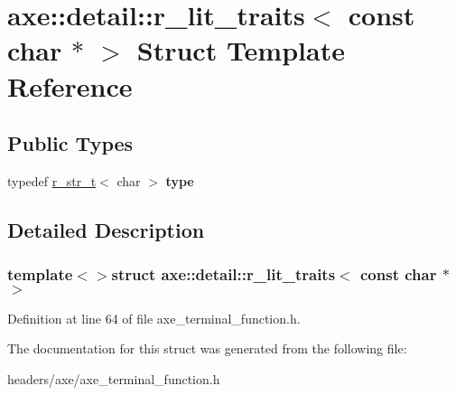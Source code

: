 \hypertarget{structaxe_1_1detail_1_1r__lit__traits_3_01const_01char_01_5_01_4}{\section{axe\+:\+:detail\+:\+:r\+\_\+lit\+\_\+traits$<$ const char $\ast$ $>$ Struct Template Reference}
\label{structaxe_1_1detail_1_1r__lit__traits_3_01const_01char_01_5_01_4}
}
\subsection*{Public Types}
\begin{DoxyCompactItemize}
\item 
\hypertarget{structaxe_1_1detail_1_1r__lit__traits_3_01const_01char_01_5_01_4_ab7eb5f885df35054a0db3bee74040b7a}{typedef \hyperlink{classaxe_1_1r__str__t}{r\+\_\+str\+\_\+t}$<$ char $>$ {\bfseries type}}\label{structaxe_1_1detail_1_1r__lit__traits_3_01const_01char_01_5_01_4_ab7eb5f885df35054a0db3bee74040b7a}

\end{DoxyCompactItemize}


\subsection{Detailed Description}
\subsubsection*{template$<$$>$struct axe\+::detail\+::r\+\_\+lit\+\_\+traits$<$ const char $\ast$ $>$}



Definition at line 64 of file axe\+\_\+terminal\+\_\+function.\+h.



The documentation for this struct was generated from the following file\+:\begin{DoxyCompactItemize}
\item 
headers/axe/axe\+\_\+terminal\+\_\+function.\+h\end{DoxyCompactItemize}
